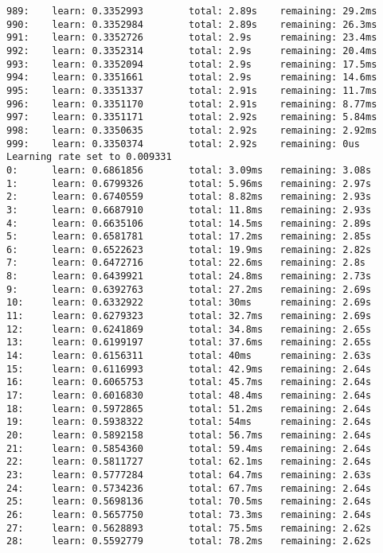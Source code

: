 \documentclass[11pt]{article}
\begin{document}
\begin{Verbatim}[commandchars=\\\{\}]
989:    learn: 0.3352993        total: 2.89s    remaining: 29.2ms
990:    learn: 0.3352984        total: 2.89s    remaining: 26.3ms
991:    learn: 0.3352726        total: 2.9s     remaining: 23.4ms
992:    learn: 0.3352314        total: 2.9s     remaining: 20.4ms
993:    learn: 0.3352094        total: 2.9s     remaining: 17.5ms
994:    learn: 0.3351661        total: 2.9s     remaining: 14.6ms
995:    learn: 0.3351337        total: 2.91s    remaining: 11.7ms
996:    learn: 0.3351170        total: 2.91s    remaining: 8.77ms
997:    learn: 0.3351171        total: 2.92s    remaining: 5.84ms
998:    learn: 0.3350635        total: 2.92s    remaining: 2.92ms
999:    learn: 0.3350374        total: 2.92s    remaining: 0us
Learning rate set to 0.009331
0:      learn: 0.6861856        total: 3.09ms   remaining: 3.08s
1:      learn: 0.6799326        total: 5.96ms   remaining: 2.97s
2:      learn: 0.6740559        total: 8.82ms   remaining: 2.93s
3:      learn: 0.6687910        total: 11.8ms   remaining: 2.93s
4:      learn: 0.6635106        total: 14.5ms   remaining: 2.89s
5:      learn: 0.6581781        total: 17.2ms   remaining: 2.85s
6:      learn: 0.6522623        total: 19.9ms   remaining: 2.82s
7:      learn: 0.6472716        total: 22.6ms   remaining: 2.8s
8:      learn: 0.6439921        total: 24.8ms   remaining: 2.73s
9:      learn: 0.6392763        total: 27.2ms   remaining: 2.69s
10:     learn: 0.6332922        total: 30ms     remaining: 2.69s
11:     learn: 0.6279323        total: 32.7ms   remaining: 2.69s
12:     learn: 0.6241869        total: 34.8ms   remaining: 2.65s
13:     learn: 0.6199197        total: 37.6ms   remaining: 2.65s
14:     learn: 0.6156311        total: 40ms     remaining: 2.63s
15:     learn: 0.6116993        total: 42.9ms   remaining: 2.64s
16:     learn: 0.6065753        total: 45.7ms   remaining: 2.64s
17:     learn: 0.6016830        total: 48.4ms   remaining: 2.64s
18:     learn: 0.5972865        total: 51.2ms   remaining: 2.64s
19:     learn: 0.5938322        total: 54ms     remaining: 2.64s
20:     learn: 0.5892158        total: 56.7ms   remaining: 2.64s
21:     learn: 0.5854360        total: 59.4ms   remaining: 2.64s
22:     learn: 0.5811727        total: 62.1ms   remaining: 2.64s
23:     learn: 0.5777284        total: 64.7ms   remaining: 2.63s
24:     learn: 0.5734236        total: 67.7ms   remaining: 2.64s
25:     learn: 0.5698136        total: 70.5ms   remaining: 2.64s
26:     learn: 0.5657750        total: 73.3ms   remaining: 2.64s
27:     learn: 0.5628893        total: 75.5ms   remaining: 2.62s
28:     learn: 0.5592779        total: 78.2ms   remaining: 2.62s

\end{Verbatim}
\end{document}
